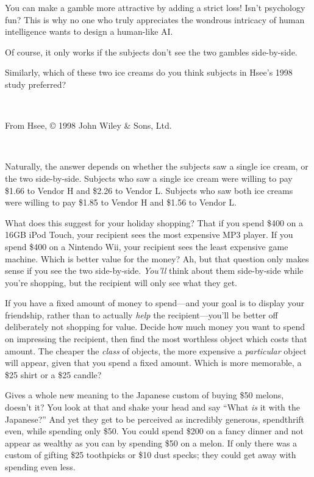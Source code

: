 {
 You can make a gamble more attractive by adding a strict loss!
Isn't psychology fun? This is why no one who truly
appreciates the wondrous intricacy of human intelligence wants to
design a human-like AI.}

{
 Of course, it only works if the subjects don't see
the two gambles side-by-side.}

{
 Similarly, which of these two ice creams do you think subjects in
Hsee's 1998 study preferred?}

{
 ~}


{\centering
{}
 \newline
 From Hsee, © 1998 John Wiley \& Sons, Ltd.
\par}


\bigskip

{
 ~}

{
 Naturally, the answer depends on whether the subjects saw a single
ice cream, or the two side-by-side. Subjects who saw a single ice cream
were willing to pay \$1.66 to Vendor H and \$2.26 to Vendor L. Subjects
who saw both ice creams were willing to pay \$1.85 to Vendor H and
\$1.56 to Vendor L.}

{
 What does this suggest for your holiday shopping? That if you
spend \$400 on a 16GB iPod Touch, your recipient sees the most
expensive MP3 player. If you spend \$400 on a Nintendo Wii, your
recipient sees the least expensive game machine. Which is better value
for the money? Ah, but that question only makes sense if you see the
two side-by-side. \textit{You'll} think about them
side-by-side while you're shopping, but the recipient
will only see what they get.}

{
 If you have a fixed amount of money to spend---and your goal is to
display your friendship, rather than to actually \textit{help} the
recipient---you'll be better off deliberately not
shopping for value. Decide how much money you want to spend on
impressing the recipient, then find the most worthless object which
costs that amount. The cheaper the \textit{class} of objects, the more
expensive a \textit{particular} object will appear, given that you
spend a fixed amount. Which is more memorable, a \$25 shirt or a \$25
candle?}

{
 Gives a whole new meaning to the Japanese custom of buying \$50
melons, doesn't it? You look at that and shake your
head and say ``What \textit{is} it with the
Japanese?'' And yet they get to be perceived as
incredibly generous, spendthrift even, while spending only \$50. You
could spend \$200 on a fancy dinner and not appear as wealthy as you
can by spending \$50 on a melon. If only there was a custom of gifting
\$25 toothpicks or \$10 dust specks; they could get away with spending
even less.}

